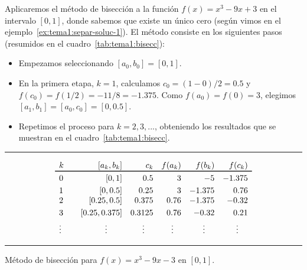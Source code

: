 \begin{example}
  Aplicaremos el método de bisección a la función $f(x)=x^3-9x+3$ en el intervalo
  $[0,1]$, donde sabemos que existe un único cero (según vimos en el
  ejemplo~\ref{ex:tema1:separ-soluc-1}). El método consiste en los
  siguientes pasos (resumidos en el cuadro~\ref{tab:tema1:bisecc}):

  \begin{itemize}
  \item Empezamos seleccionando $[a_0,b_0]=[0,1]$.
  \item En la primera etapa, $k=1$, calculamos
    $c_0=(1-0)/2=0.5$  y
    $f(c_0)=f(1/2)=-11/8=-1.375$. Como $f(a_0)=f(0)=3$, elegimos
    $[a_1,b_1]=[a_0,c_0]=[0,0.5]$.
  \item Repetimos el proceso para $k=2,3,...$, obteniendo los resultados que se
    muestran en el cuadro~\ref{tab:tema1:bisecc}.
  \end{itemize}

\end{example}
\begin{table}
  \centering
  \rule{0.99\linewidth}{1.6pt}
  \begin{equation*}
    \begin{array}{l<{\quad}rrrrr}%
       k &  [a_k,b_k] & c_k & f(a_k) & f(b_k) & f(c_k)
      \\ \toprule%
      0 & [0,1]  &  0.5 & 3 & -5 & -1.375
      \\ \noalign{\smallskip}
                1 &  [0,0.5] &  0.25
                & 3 & -1.375 & 0.76
                \\ \smallskip
                2 & [0.25,0.5] & 0.375
                & 0.76 & -1.375 & -0.32
                \\ \smallskip
                3& [0.25,0.375] & 0.3125
                & 0.76 & -0.32 & 0.21
                \\
                \hfill \vdots \hfill~ & \hfill \vdots \hfill~ &
                \hfill \vdots \hfill~ & \hfill \vdots \hfill~ &
                \hfill \vdots \hfill~ & \hfill \vdots \hfill~
              \end{array}
            \end{equation*}
            \rule{0.99\linewidth}{1.5pt}
            \caption{Método de bisección para $f(x)=x^3-9x-3$ en $[0,1]$.}
            \label{tab:tema1:bisecc}
          \end{table}

